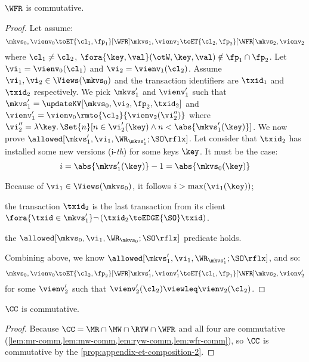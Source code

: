 \begin{lemma}
    \label{lem:wfr-comm}
    \(\WFR\) is commutative.
\end{lemma}
\begin{proof}
    Let assume:
    \[
        \mkvs_0, \vienv_0 \toET{\cl_1, \fp_1}[\WFR] \mkvs_1, \vienv_1 \toET{\cl_2, \fp_2}[\WFR] \mkvs_2, \vienv_2 
    \]
    where \( \cl_1 \neq \cl_2 \), \( \fora{ \key,\val } (\otW, \key, \val) \notin \fp_1 \cap \fp_2 \).
    Let \(\vi_1 = \vienv_0(\cl_1) \) and \( \vi_2 = \vienv_1(\cl_2)\).
    Assume \( \vi_1, \vi_2 \in \Views(\mkvs_0)\) and the transaction identifiers are \( \txid_1 \) and \( \txid_2 \) respectively.
    We pick \( \mkvs'_1 \) and \( \vienv'_1 \) such that \( \mkvs'_1 = \updateKV[\mkvs_0,\vi_2,\fp_2,\txid_2] \) and \( \vienv'_1 = \vienv_0\rmto{\cl_2}{\vienv_2(\vi''_2)} \)
    where \( \vi''_2 = \lambda \key \ldotp \Set{ n }[ n \in \vi'_2(\key) \land n < \abs{\mkvs'_1(\key)}] \).
    We now prove \( \allowed[\mkvs'_1,\vi_1, \WR_{\mkvs'_1} ; \SO\rflx] \).
    Let consider that \( \txid_2 \) has installed some new versions (i-\emph{th}) for some keys \( \key \).
    It must be the case:
    \[
        i = \abs{\mkvs'_1(\key)} - 1  = \abs{\mkvs_0(\key)}
    \]
    \begin{enumerate*}
        \item Because of \( \vi_1 \in \Views(\mkvs_0)\), it follows \( i > \max(\vi_1(\key))\);
        \item the transaction \( \txid_2 \) is the last transaction from its client \( \fora{ \txid \in \mkvs'_1} \neg \left(\txid_2 \toEDGE{\SO} \txid\right) \).
        \item the \(\allowed[\mkvs_0,\vi_1,\WR_{\mkvs_0} ; \SO\rflx] \) predicate holds.
    \end{enumerate*}
    Combining above, we know \( \allowed[\mkvs'_1,\vi_1,\WR_{\mkvs'_1} ; \SO\rflx] \), and so:
    \[
        \mkvs_0, \vienv_0 \toET{\cl_2, \fp_2}[\WFR] \mkvs'_1, \vienv'_1 \toET{\cl_1,\fp_1}[\WFR] \mkvs_2, \vienv'_2 
    \]
    for some \( \vienv'_2 \) such that \( \vienv'_2(\cl_2) \viewleq \vienv_2(\cl_2) \).

\end{proof}

\begin{proposition}
    \label{lem:cc-comm}
    \label{prop:cc-comm}
    \( \CC \) is commutative.
\end{proposition}
\begin{proof}
    Because \( \CC = \MR \cap \MW \cap \RYW \cap \WFR \) and all four are commutative (\cref{lem:mr-comm,lem:mw-comm,lem:ryw-comm,lem:wfr-comm}), so \( \CC \) is commutative by the \cref{prop:appendix-et-composition-2}.
\end{proof}

